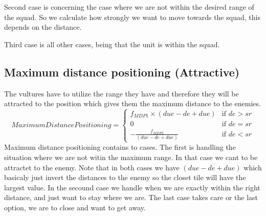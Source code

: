 		Second case  is concerning the case where we are not within the desired range of the squad. So we calculate how strongly we want to move towards the squad, this depends on the distance. 
		
		Third case is all other cases, being that the unit is within the squad.
					
	\subsection*{Maximum distance positioning (Attractive)}
		The vultures have to utilize the range they have and therefore they will be attracted to the position which gives them the maximum distance 
		to the enemies.
		\begin{displaymath}
			MaximumDistancePositioning = \begin{cases}
					f_{MDP1} \times (due - de + due) & \text{if } de > sr\\
					0 & \text{if } de = sr\\
					- \frac{f_{MDP2}}{(due - de + due)} & \text{if } de < sr
				\end{cases}		
		\end{displaymath}
		Maximum distance positioning contains to cases. The first is handling the situation where we are not witin the maximum range. In that case we cant to be attractet to the enemy. Note that in both cases we have $(due - de + due)$ which basicaly just invert the distances to the enemy so the closet tile will have the largest value.
		In the secound case we handle when we are exactly within the right distance, and just want to stay where we are.
		The last case takes care or the last option, we are to close and want to get away.
		
		
		
